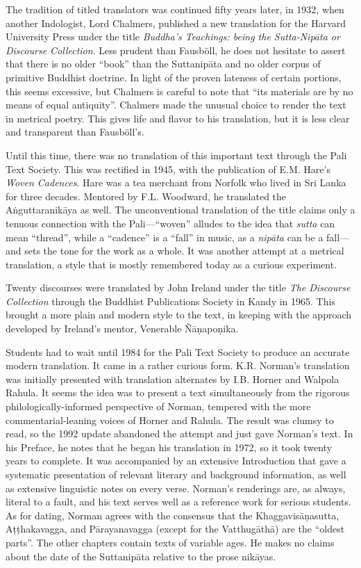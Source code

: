 \documentclass[12pt,openany]{book}%
\begin{document}
The tradition of titled translators was continued fifty years later, in 1932, when another Indologist, Lord Chalmers, published a new translation for the Harvard University Press under the title \textit{Buddha’s Teachings: being the Sutta-\textsanskrit{Nipāta} or Discourse Collection}. Less prudent than Fausböll, he does not hesitate to assert that there is no older “book” than the \textsanskrit{Suttanipāta} and no older corpus of primitive Buddhist doctrine. In light of the proven lateness of certain portions, this seems excessive, but Chalmers is careful to note that “its materials are by no means of equal antiquity”. Chalmers made the unusual choice to render the text in metrical poetry. This gives life and flavor to his translation, but it is less clear and transparent than Fausböll’s.

Until this time, there was no translation of this important text through the Pali Text Society. This was rectified in 1945, with the publication of E.M. Hare’s \textit{Woven Cadences}. Hare was a tea merchant from Norfolk who lived in Sri Lanka for three decades. Mentored by F.L. Woodward, he translated the \textsanskrit{Aṅguttaranikāya} as well. The unconventional translation of the title claims only a tenuous connection with the Pali—“woven” alludes to the idea that \textit{sutta} can mean “thread”, while a “cadence” is a “fall” in music, as a \textit{\textsanskrit{nipāta}} can be a fall—and sets the tone for the work as a whole. It was another attempt at a metrical translation, a style that is mostly remembered today as a curious experiment.

Twenty discourses were translated by John Ireland under the title \textit{The Discourse Collection} through the Buddhist Publications Society in Kandy in 1965. This brought a more plain and modern style to the text, in keeping with the approach developed by Ireland’s mentor, Venerable \textsanskrit{Ñāṇapoṇika}.

Students had to wait until 1984 for the Pali Text Society to produce an accurate modern translation. It came in a rather curious form. K.R. Norman’s translation was initially presented with translation alternates by I.B. Horner and Walpola Rahula. It seems the idea was to present a text simultaneously from the rigorous philologically-informed perspective of Norman, tempered with the more commentarial-leaning voices of Horner and Rahula. The result was clumsy to read, so the 1992 update abandoned the attempt and just gave Norman’s text. In his Preface, he notes that he began his translation in 1972, so it took twenty years to complete. It was accompanied by an extensive Introduction that gave a systematic presentation of relevant literary and background information, as well as extensive linguistic notes on every verse. Norman’s renderings are, as always, literal to a fault, and his text serves well as a reference work for serious students. As for dating, Norman agrees with the consensus that the \textsanskrit{Khaggavisāṇasutta}, \textsanskrit{Aṭṭhakavagga}, and \textsanskrit{Pārayanavagga} (except for the \textsanskrit{Vatthugāthā}) are the “oldest parts”. The other chapters contain texts of variable ages. He makes no claims about the date of the \textsanskrit{Suttanipāta} relative to the prose \textsanskrit{nikāyas}.
\end{document}
